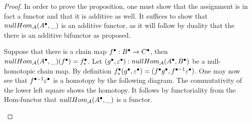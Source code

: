     \begin{proof}
        In order to prove the proposition, one must show that the assignment is in fact a functor and that it is additive as well. It suffices to show that $nullHom_{\mathcal{A}}(A^{\bullet},\_)$ is an additive functor, as it will follow by duality that the there is an additive bifunctor as proposed.
        
        Suppose that there is a chain map $f^{\bullet}:B^{\bullet}\rightarrow C^{\bullet}$, then $nullHom_{\mathcal{A}}(A^{\bullet},\_)(f^{\bullet})=f^{\bullet}_*$. Let $(g^{\bullet},\varepsilon^{\bullet}):nullHom_{\mathcal{A}}(A^{\bullet},B^{\bullet})$ be a null-homotopic chain map. By definition $f^{\bullet}_*(g^{\bullet},\varepsilon^{\bullet})=(f^{\bullet}g^{\bullet},f^{\bullet-1}\varepsilon^{\bullet})$. One may now see that $f^{\bullet-1}\varepsilon^{\bullet}$ is a homotopy by the following diagram. The commutativity of the lower left square shows the homotopy. It follows by functoriality from the Hom-functor that $nullHom_{\mathcal{A}}(A^{\bullet},\_)$ is a functor.
        \begin{center}
        \end{center}


\end{proof}
